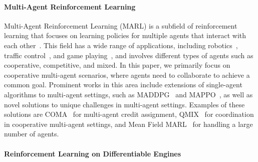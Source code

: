 \paragraph{Multi-Agent Reinforcement Learning}
Multi-Agent Reinforcement Learning (MARL) is a subfield of reinforcement learning that focuses on learning policies for multiple agents that interact with each other~\cite{albrecht2024multi}. 
This field has a wide range of applications, 
including robotics~\cite{DBLP:journals/air/ChungFYN24}, 
traffic control~\cite{DBLP:journals/tits/ChuWCL20}, 
and game playing~\cite{DBLP:conf/iclr/BakerKMWPMM20,jaderberg2019human}, 
and involves different types of agents such as cooperative, competitive, and mixed. 
In this paper, we primarily focus on cooperative multi-agent scenarios, 
where agents need to collaborate to achieve a common goal. 
Prominent works in this area include extensions of single-agent algorithms to multi-agent settings, 
such as MADDPG~\cite{DBLP:conf/nips/LoweWTHAM17} and MAPPO~\cite{DBLP:conf/nips/YuVVGWBW22}, 
as well as novel solutions to unique challenges in multi-agent settings. Examples of these solutions are COMA~\cite{DBLP:conf/aaai/FoersterFANW18} for multi-agent credit assignment, 
QMIX~\cite{DBLP:conf/icml/RashidSWFFW18} for coordination in cooperative multi-agent settings, 
and Mean Field MARL~\cite{DBLP:conf/icml/YangLLZZW18} for handling a large number of agents.

\paragraph{Reinforcement Learning on Differentiable Engines}


